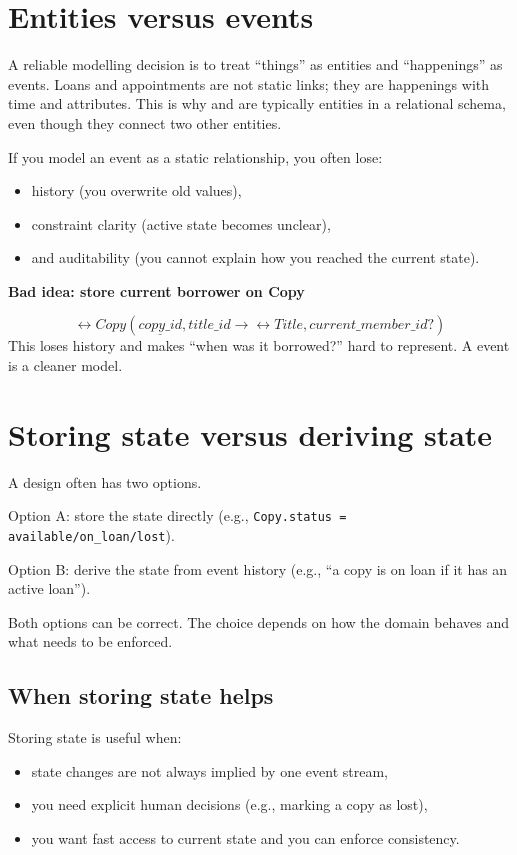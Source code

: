 \section{Entities versus events}
A reliable modelling decision is to treat “things” as entities and “happenings” as events.
Loans and appointments are not static links; they are happenings with time and attributes.
This is why  and  are typically entities in a relational schema, even though they connect two other entities.

If you model an event as a static relationship, you often lose:
\begin{itemize}[leftmargin=*,nosep]
  \item history (you overwrite old values),
  \item constraint clarity (active state becomes unclear),
  \item and auditability (you cannot explain how you reached the current state).
\end{itemize}

\begin{examplebox}
\textbf{Bad idea: store current borrower on Copy}\par\smallskip
\[
\rel{Copy}(\underline{copy\_id}, title\_id \rightarrow \rel{Title}, current\_member\_id?)
\]
This loses history and makes “when was it borrowed?” hard to represent.
A  event is a cleaner model.
\end{examplebox}

\section{Storing state versus deriving state}
A design often has two options.

Option A: store the state directly (e.g., \texttt{Copy.status = available/on\_loan/lost}).

Option B: derive the state from event history (e.g., “a copy is on loan if it has an active loan”).

Both options can be correct.
The choice depends on how the domain behaves and what needs to be enforced.

\subsection{When storing state helps}
Storing state is useful when:
\begin{itemize}[leftmargin=*,nosep]
  \item state changes are not always implied by one event stream,
  \item you need explicit human decisions (e.g., marking a copy as lost),
  \item you want fast access to current state and you can enforce consistency.
\end{itemize}


